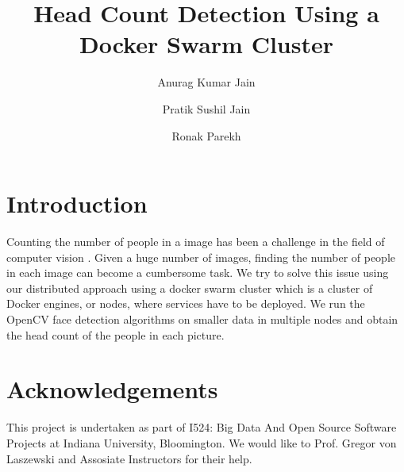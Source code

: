 \documentclass[9pt,twocolumn,twoside]{styles/osajnl}
\title{Head Count Detection Using a Docker Swarm Cluster}
\author[1]{Anurag Kumar Jain}
\author[1]{Pratik Sushil Jain}
\author[1]{Ronak Parekh}
\affil[1]{School of Informatics and Computing, Bloomington, IN 47408, U.S.A.}
\begin{document}
\maketitle

\section{Introduction}

Counting the number of people in a image has been a challenge in the
field of computer vision \cite{www-face-detection-wikipedia}. Given a
huge number of images, finding the number of people in each image can
become a cumbersome task. We try to solve this issue using our
distributed approach using a docker swarm cluster which is a cluster
of Docker \cite{www-docker-wikipedia} engines, or nodes, where
services have to be deployed. We run the OpenCV
\cite{www-opencv-wikipedia} face detection algorithms on smaller data
in multiple nodes and obtain the head count of the people in each
picture.

\section*{Acknowledgements}

This project is undertaken as part of I524: Big Data And Open Source
Software Projects at Indiana University, Bloomington. We would like to
Prof. Gregor von Laszewski and Assosiate Instructors for their help.



\end{document}
